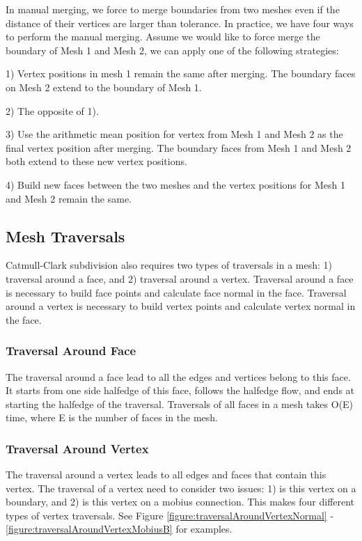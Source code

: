 \documentclass[12pt]{article}
\begin{document}
In manual merging, we force to merge boundaries from two meshes even if the distance of their vertices are larger than tolerance. In practice, we have four ways to perform the manual merging. Assume we would like to force merge the boundary of Mesh 1 and Mesh 2, we can apply one of the following strategies:

1) Vertex positions in mesh 1 remain the same after merging. The boundary faces on Mesh 2 extend to the boundary of Mesh 1.

2) The opposite of 1).

3) Use the arithmetic mean position for vertex from Mesh 1 and Mesh 2 as the final vertex position after merging. The boundary faces from Mesh 1 and Mesh 2 both extend to these new vertex positions.

4) Build new faces between the two meshes and the vertex positions for Mesh 1 and Mesh 2 remain the same.

\subsection{Mesh Traversals} 
Catmull-Clark subdivision also requires two types of traversals in a mesh: 1) traversal around a face, and 2) traversal around a vertex. Traversal around a face is necessary to build face points and calculate face normal in the face. Traversal around a vertex is necessary to build vertex points and calculate vertex normal in the face.

\subsubsection{Traversal Around Face}
The traversal around a face lead to all the edges and vertices belong to this face. It starts from one side halfedge of this face, follows the halfedge flow, and ends at starting the halfedge of the traversal.
Traversals of all faces in a mesh takes O(E) time, where E is the number of faces in the mesh.

\subsubsection{Traversal Around Vertex}
The traversal around a vertex leads to all edges and faces that contain this vertex. The traversal of a vertex need to consider two issues: 1) is this vertex on a boundary, and  2) is this vertex on a mobius connection. This makes four different types of vertex traversals. See Figure \ref{figure:traversalAroundVertexNormal} - \ref{figure:traversalAroundVertexMobiusB} for examples.
\end{document}
